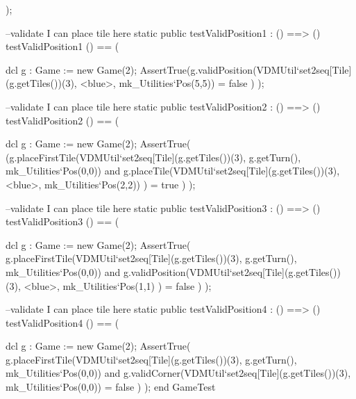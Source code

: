 \begin{vdm_al}
  );
  
  --validate I can place tile here
  static public testValidPosition1 : () ==> ()
  testValidPosition1 () == (
    
    dcl g : Game := new Game(2);
    AssertTrue(g.validPosition(VDMUtil`set2seq[Tile](g.getTiles())(3), <blue>,
               mk_Utilities`Pos(5,5)) = false )
  );
  
  --validate I can place tile here
  static public testValidPosition2 : () ==> ()
  testValidPosition2 () == (
    
    dcl g : Game := new Game(2);
    AssertTrue( (g.placeFirstTile(VDMUtil`set2seq[Tile](g.getTiles())(3), g.getTurn(),
              mk_Utilities`Pos(0,0)) and g.placeTile(VDMUtil`set2seq[Tile](g.getTiles())(3),
              <blue>, mk_Utilities`Pos(2,2)) ) = true )
  );
  
  --validate I can place tile here
  static public testValidPosition3 : () ==> ()
  testValidPosition3 () == (
    
    dcl g : Game := new Game(2);
    AssertTrue( g.placeFirstTile(VDMUtil`set2seq[Tile](g.getTiles())(3), g.getTurn(),
              mk_Utilities`Pos(0,0)) and g.validPosition(VDMUtil`set2seq[Tile](g.getTiles())(3),
              <blue>, mk_Utilities`Pos(1,1) ) = false )
  );
  
  --validate I can place tile here
  static public testValidPosition4 : () ==> ()
  testValidPosition4 () == (
    
    dcl g : Game := new Game(2);
    AssertTrue( g.placeFirstTile(VDMUtil`set2seq[Tile](g.getTiles())(3), g.getTurn(),
              mk_Utilities`Pos(0,0)) and g.validCorner(VDMUtil`set2seq[Tile](g.getTiles())(3),
              mk_Utilities`Pos(0,0)) = false )
  );
end GameTest
\end{vdm_al}
\bigskip
